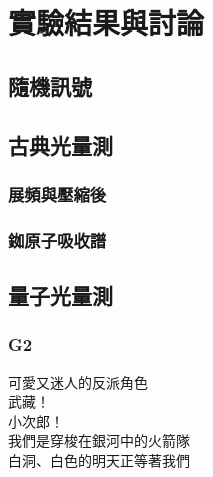 \documentclass[class=NCU_thesis, crop=false]{standalone}
\begin{document}
\chapter{實驗結果與討論}
\section{隨機訊號}
\section{古典光量測}
\subsection{展頻與壓縮後}
\subsection{銣原子吸收譜}
\section{量子光量測}
\subsection{G2}



\centering 

可愛又迷人的反派角色  \\
武藏！ \\
小次郎！ \\
我們是穿梭在銀河中的火箭隊 \\
白洞、白色的明天正等著我們 \\
\end{document}
